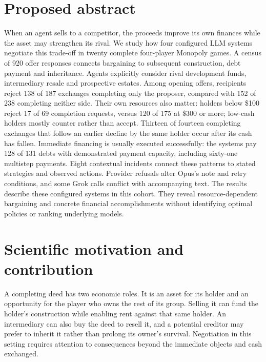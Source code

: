 
\section*{Proposed abstract}

When an agent sells to a competitor, the proceeds improve its own finances
while the asset may strengthen its rival. We study how four configured LLM
systems negotiate this trade-off in twenty complete four-player Monopoly
games. A census of 920 offer responses connects bargaining to subsequent
construction, debt payment and inheritance. Agents explicitly consider rival
development funds, intermediary resale and prospective estates. Among opening
offers, recipients reject 138 of 187 exchanges completing only the proposer,
compared with 152 of 238 completing neither side. Their own resources also
matter: holders below \$100 reject 17 of 69 completion requests, versus
120 of 175 at \$300 or more; low-cash holders mostly counter rather than
accept. Thirteen of fourteen completing exchanges that follow an earlier
decline by the same holder occur after its cash has fallen. Immediate
financing is usually executed successfully: the systems pay 128 of 131 debts
with demonstrated payment capacity, including sixty-one multistep payments.
Eight contextual incidents connect these patterns to stated strategies and
observed actions. Provider refusals alter Opus's note and retry conditions,
and some Grok calls conflict with accompanying text. The results describe
these configured systems in this cohort. They reveal resource-dependent
bargaining and concrete financial accomplishments without identifying
optimal policies or ranking underlying models.

\section*{Scientific motivation and contribution}

A completing deed has two economic roles. It is an asset for its holder and
an opportunity for the player who owns the rest of its group. Selling it can
fund the holder's construction while enabling rent against that same holder.
An intermediary can also buy the deed to resell it, and a potential creditor
may prefer to inherit it rather than prolong its owner's survival. Negotiation
in this setting requires attention to consequences beyond the immediate
objects and cash exchanged.

